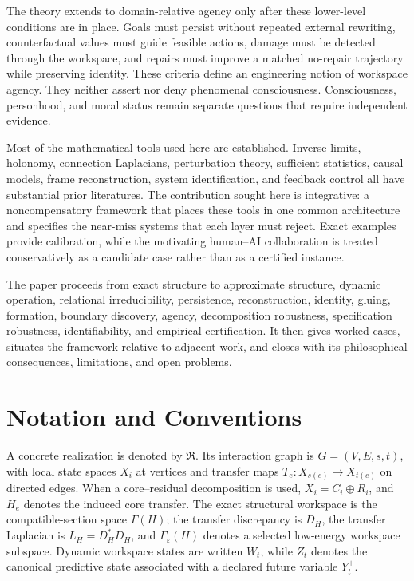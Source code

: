 The theory extends to domain-relative agency only after these lower-level conditions are in place. Goals
must persist without repeated external rewriting, counterfactual values must guide feasible actions, damage
must be detected through the workspace, and repairs must improve a matched no-repair trajectory while
preserving identity. These criteria define an engineering notion of workspace agency. They neither assert
nor deny phenomenal consciousness. Consciousness, personhood, and moral status remain separate questions
that require independent evidence.

Most of the mathematical tools used here are established. Inverse limits, holonomy, connection Laplacians,
perturbation theory, sufficient statistics, causal models, frame reconstruction, system identification, and
feedback control all have substantial prior literatures. The contribution sought here is integrative: a
noncompensatory framework that places these tools in one common architecture and specifies the near-miss
systems that each layer must reject. Exact examples provide calibration, while the motivating human--AI
collaboration is treated conservatively as a candidate case rather than as a certified instance.

The paper proceeds from exact structure to approximate structure, dynamic operation, relational
irreducibility, persistence, reconstruction, identity, gluing, formation, boundary discovery, agency,
decomposition robustness, specification robustness, identifiability, and empirical certification. It then
gives worked cases, situates the framework relative to adjacent work, and closes with its philosophical
consequences, limitations, and open problems.

\section*{Notation and Conventions}

A concrete realization is denoted by \(\mathfrak R\). Its interaction graph is \(G=(V,E,s,t)\), with local
state spaces \(X_i\) at vertices and transfer maps \(T_e:X_{s(e)}\to X_{t(e)}\) on directed edges. When a
core--residual decomposition is used, \(X_i=C_i\oplus R_i\), and \(H_e\) denotes the induced core transfer.
The exact structural workspace is the compatible-section space \(\Gamma(H)\); the transfer discrepancy is
\(D_H\), the transfer Laplacian is \(L_H=D_H^*D_H\), and \(\Gamma_\varepsilon(H)\) denotes a selected
low-energy workspace subspace. Dynamic workspace states are written \(W_t\), while \(Z_t\) denotes the
canonical predictive state associated with a declared future variable \(Y_t^+\).

